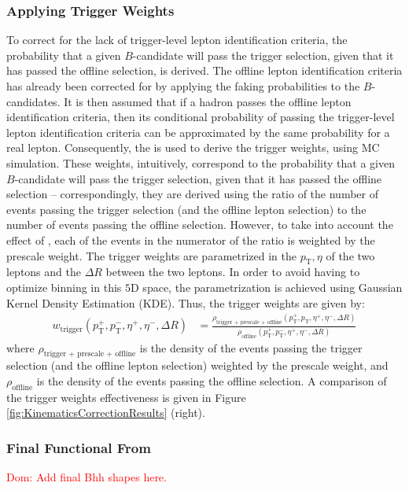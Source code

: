 \subsubsection{Applying Trigger Weights}
\label{subsec:applying-trigger-weights}
To correct for the lack of trigger-level lepton identification criteria, the probability that a given $B$-candidate will pass the trigger selection, given that it has passed the offline selection, is derived. %
The offline lepton identification criteria has already been corrected for by applying the faking probabilities to the $B$-candidates.
It is then assumed that if a hadron passes the offline lepton identification criteria, then its conditional probability of passing the trigger-level lepton identification criteria can be approximated by the same probability for a real lepton. %
Consequently, the  is used to derive the trigger weights, using MC simulation. %
These weights, intuitively, correspond to the probability that a given $B$-candidate will pass the trigger selection, given that it has passed the offline selection -- correspondingly, they are derived using the ratio of the number of events passing the trigger selection (and the offline lepton selection) to the number of events passing the offline selection. %
However, to take into account the effect of , each of the events in the numerator of the ratio is weighted by the prescale weight. %
The trigger weights are parametrized in the $p_{\text{T}}, \eta$ of the two leptons and the $\Delta R$ between the two leptons. %
In order to avoid having to optimize binning in this $5{\text{D}}$ space, the parametrization is achieved using Gaussian Kernel Density Estimation (KDE). %
Thus, the trigger weights are given by:
\begin{align}
    w_{\text{trigger}}( p_{\text{T}}^+, p_{\text{T}}^-, \eta^+, \eta^-, \Delta R) &= \frac{\rho_{\text{trigger + prescale + offline}}(p_{\text{T}}^+, p_{\text{T}}, \eta^+, \eta^-, \Delta R)}{\rho_{\text{offline}}(p_{\text{T}}^+, p_{\text{T}}^-, \eta^+, \eta^-, \Delta R)}
\end{align}
where $\rho_{\text{trigger + prescale + offline}}$ is the density of the events passing the trigger selection (and the offline lepton selection) weighted by the prescale weight, and $\rho_{\text{offline}}$ is the density of the events passing the offline selection. %
A comparison of the trigger weights effectiveness is given in Figure \ref{fig:KinematicsCorrectionResults} (right). 

\subsubsection{Final \Bhh Functional From}
\label{subsubsec:BhhFunctionalForm}
\textcolor{red}{Dom: Add final Bhh shapes here.}




